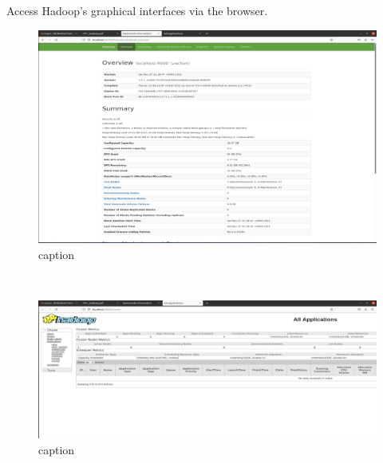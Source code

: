 \begin{spacing}{1.2}
\par Access Hadoop's graphical interfaces via the browser.
\\
\begin{figure}[!htb] 
\begin{center} 
\includegraphics[width=1\linewidth]{Big_Data/Hadoop/Apache Hadoop Installation/Hadoop interface on port 9870.jpg} 
\end{center} 
\caption{caption} 
\end{figure} 
\FloatBarrier
\\
\begin{figure}[!htb] 
\begin{center} 
\includegraphics[width=1\linewidth]{Big_Data/Hadoop/Apache Hadoop Installation/ResourceManager Interface.jpg} 
\end{center} 
\caption{caption} 
\end{figure} 
\FloatBarrier




\end{spacing}